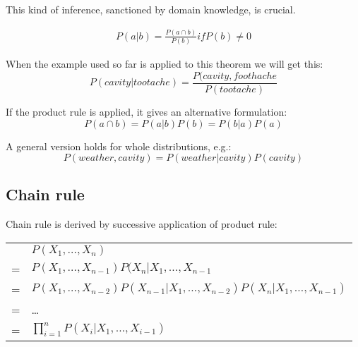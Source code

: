 This kind of inference, sanctioned by domain knowledge, is crucial.

\begin{theorem}
\begin{align}
P(a|b) = \frac{P(a \cap b)}{P(b)} if P(b) \neq 0
\end{align}
\end{theorem}

When the example used so far is applied to this theorem we will get this:\\
\begin{equation}
P(cavity|tootache) = \frac{P(cavity, foothache}{P(tootache)}
\end{equation}

If the product rule is applied, it gives an alternative formulation:\\
\begin{equation}
P(a \cap b) = P(a|b)P(b) = P(b|a)P(a)
\end{equation}

A general version holds for whole distributions, e.g.:\\
\begin{equation}
P(weather, cavity) = P(weather|cavity)P(cavity)
\end{equation}

\subsection{Chain rule}
Chain rule is derived by successive application of product rule:

\begin{table}
\centering
\begin{tabular}{l l}
 & $P(X_1, \dots , X_n)$\\
= & $P(X_1, \dots , X_{n-1})P(X_n | X_1, \dots , X_{n-1}$\\
= & $P(X_1, \dots , X_{n-2})P(X_{n-1}|X_1, \dots, X_{n-2})P(X_n|X_1, \dots , X_{n-1})$\\
= & \dots \\
= & $\prod_{i = 1}^n P(X_i|X_1, \dots , X_{i-1})$ 
\end{tabular}
\end{table}